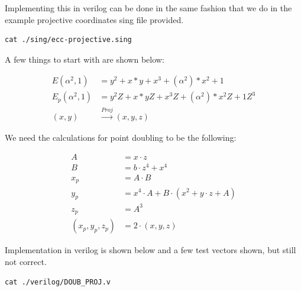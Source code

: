 \documentclass[a4paper,11pt]{exam}
\begin{document}
\noindent
Implementing this in verilog can be done in the same fashion that we do in the example projective coordinates sing file provided.

\begin{verbatim}
cat ./sing/ecc-projective.sing
\end{verbatim}

A few things to start with are shown below:

\begin{align*}
 E(\alpha^2, 1) &= y^2 + x*y + x^3 + (\alpha^2)*x^2 + 1\\
 E_p(\alpha^2, 1) &= y^2Z + x*yZ + x^3Z + (\alpha^2)*x^2Z + 1Z^3\\
(x,y) &\xrightarrow{Proj}(x,y,z)
\end{align*}

We need the calculations for point doubling to be the following:

\begin{align*}
A &= x\cdot z\\
B &= b\cdot z^4 + x^4\\
x_p &= A\cdot B\\
y_p &= x^4\cdot A + B\cdot (x^2 + y\cdot z + A)\\
z_p &= A^3\\
(x_p,y_p,z_p) &= 2\cdot(x,y,z)
\end{align*}

\noindent
Implementation in verilog is shown below and a few test vectors shown, but still not correct.

\begin{verbatim}
cat ./verilog/DOUB_PROJ.v
\end{verbatim}
\end{document}
